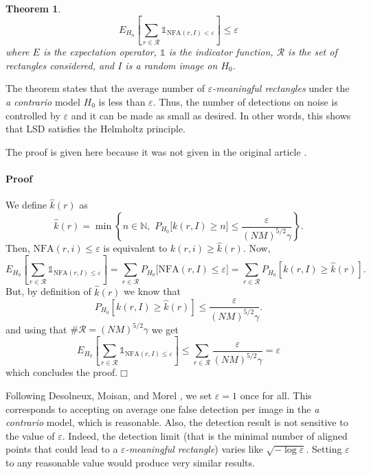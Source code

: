 \documentclass{ipol}
\newtheorem{theorem}{Theorem}
\begin{document}
\begin{theorem}
$$
   E_{H_0}\left[\sum_{r\in\mathcal{R}} \mathds{1}_{\textrm{NFA}(r,I)<\varepsilon}
         \right] \leq \varepsilon
$$
where $E$ is the expectation operator, $\mathds{1}$ is the indicator
function, $\mathcal{R}$ is the set of rectangles considered, and $I$
is a random image on $H_0$.
\end{theorem}

The theorem states that the average number
of \emph{$\varepsilon$-meaningful rectangles} under the \emph{a
contrario} model $H_0$ is less than $\varepsilon$. Thus, the number of
detections on noise is controlled by $\varepsilon$ and it can be made
as small as desired. In other words, this shows that LSD satisfies the
Helmholtz principle.

The proof is given here because it was not given in the original
article \cite{lsd}.

\paragraph{Proof}
We define $\hat{k}(r)$ as
$$
   \hat{k}(r) = \min\left\{n\in\mathds{N},
                \,\,P_{H_0}\big[k(r,I)\geq n\big]
                \leq\frac{\varepsilon}{(NM)^{5/2}\gamma}\right\}.
$$
Then, $\textrm{NFA}(r,i)\leq\varepsilon$ is equivalent to
$k(r,i)\geq\hat{k}(r)$. Now,
$$
   E_{H_0}\left[\sum_{r\in\mathcal{R}}
                \mathds{1}_{\textrm{NFA}(r,I)\leq\varepsilon}\right]
                = \sum_{r\in\mathcal{R}}
                P_{H_0}\big[\textrm{NFA}(r,I)\leq\varepsilon\big] =
                \sum_{r\in\mathcal{R}}
                P_{H_0}\left[k(r,I)\geq\hat{k}(r)\right].
$$
But, by definition of $\hat{k}(r)$ we know that
$$
   P_{H_0}\left[k(r,I)\geq\hat{k}(r)\right] \leq
     \frac{\varepsilon}{(NM)^{5/2}\gamma}.
$$
and using that $\#\mathcal{R}=(NM)^{5/2}\gamma$ we get
$$
   E_{H_0}\left[\sum_{r\in\mathcal{R}}
                \mathds{1}_{\textrm{NFA}(r,I)\leq\varepsilon}\right]
                \leq \sum_{r\in\mathcal{R}} \frac{\varepsilon}{(NM)^{5/2}\gamma}
                = \varepsilon
$$
which concludes the proof.\hfill$\Box$

\medskip

Following Desolneux, Moisan, and Morel \cite{dmm2000,dmm2008}, we set
$\varepsilon=1$ once for all. This corresponds to accepting on average
one false detection per image in the \emph{a contrario} model, which
is reasonable. Also, the detection result is not sensitive to the
value of $\varepsilon$. Indeed, the detection limit (that is the
minimal number of aligned points that could lead to
a \emph{$\varepsilon$-meaningful rectangle}) varies like
$\sqrt{-\log\varepsilon}$. Setting $\varepsilon$ to any reasonable
value would produce very similar results.
\end{document}
